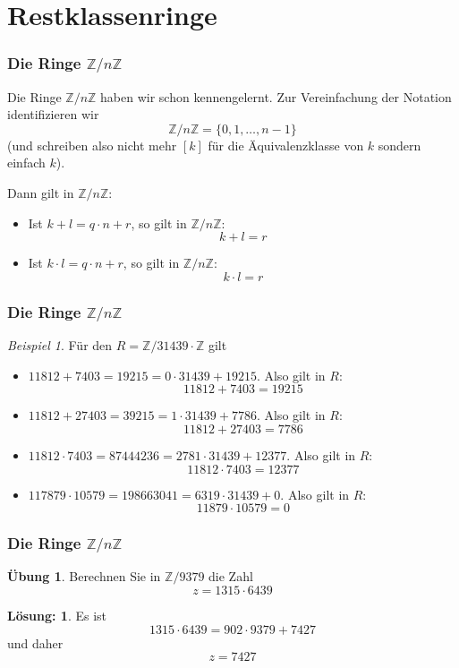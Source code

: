\documentclass[hyperref={pdfpagelabels=false}]{beamer}
\theoremstyle{plain}%
\theoremstyle{definition}
\newtheorem*{uebung}{Übung}
\newtheorem*{sol}{Lösung:}
\theoremstyle{remark}
\newtheorem*{beispiel}{Beispiel}
\def \Z{\mathbb Z}
\begin{document}
\section{Restklassenringe}
\begin{frame}
\frametitle{Die Ringe $\Z/n\Z$}

Die Ringe $\Z/n\Z$ haben wir schon kennengelernt. \pause Zur Vereinfachung der Notation identifizieren wir 
	$$ \Z / n\Z = \{ 0, 1, \ldots, n-1\} $$
(und schreiben also nicht mehr $[k]$ für die Äquivalenzklasse von $k$ sondern einfach $k$). 

\pause 

Dann gilt in $\Z/n\Z$: 

\begin{itemize} 
\item<3-> Ist $k + l = q \cdot n + r$, so gilt in $\Z/n \Z$: 
	$$ k+l = r $$
\item<4->  Ist $k \cdot l = q \cdot n + r$, so gilt in $\Z/n \Z$: 
	$$ k \cdot l = r $$
\end{itemize}
\end{frame}

\begin{frame}
\frametitle{Die Ringe $\Z/n\Z$}

\begin{beispiel}
Für den $R = \Z/31439 \cdot \Z$ gilt 

\begin{itemize}
\item<2-> $11812 + 7403 = 19215 = 0 \cdot 31439 + 19215$. Also gilt in $R$: 
	$$ 11812 + 7403 = 19215 $$
\item<3-> $11812 + 27403 = 39215 = 1 \cdot 31439 + 7786$. Also gilt in $R$: 
	$$ 11812 + 27403 = 7786 $$
\item<4-> $11812 \cdot 7403 = \num{87444236} = 2781 \cdot 31439 + 12377$. Also gilt in $R$: 
	$$ 11812 \cdot 7403 = 12377 $$
\item<5-> $117879 \cdot 10579 = \num{198663041} = 6319 \cdot 31439 + 0$. Also gilt in $R$: 
	$$ 11879 \cdot 10579 = 0 $$
\end{itemize}

\end{beispiel}

\end{frame}

\begin{frame}
\frametitle{Die Ringe $\Z/n\Z$}

\begin{uebung}
Berechnen Sie in $\Z/9379$ die Zahl
	$$ z = 1315 \cdot 6439 $$
\end{uebung}

\bigbreak

\pause \pause 

\begin{sol}
Es ist 
	$$  1315 \cdot 6439 = 902 \cdot 9379 + 7427 $$
und daher 
	$$ z = 7427 $$
\end{sol}
\end{frame}
\end{document}
